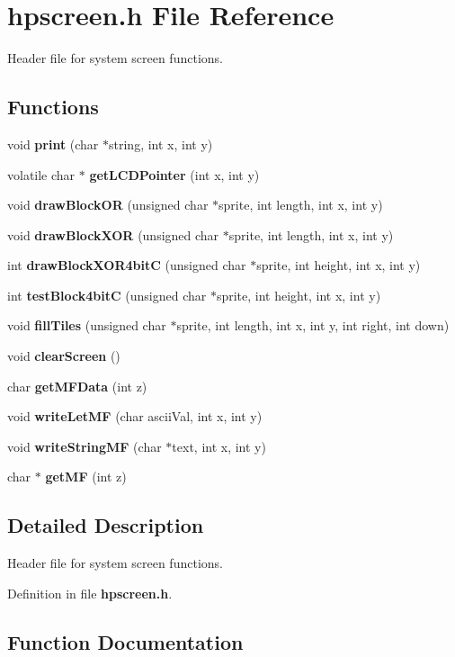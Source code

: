 \section{hpscreen.h File Reference}
\label{hpscreen_8h}
Header file for system screen functions. 


\subsection*{Functions}
\begin{CompactItemize}
\item 
void {\bf print} (char $\ast$string, int x, int y)
\item 
volatile char $\ast$ {\bf get\-LCDPointer} (int x, int y)
\item 
void {\bf draw\-Block\-OR} (unsigned char $\ast$sprite, int length, int x, int y)
\item 
void {\bf draw\-Block\-XOR} (unsigned char $\ast$sprite, int length, int x, int y)
\item 
int {\bf draw\-Block\-XOR4bit\-C} (unsigned char $\ast$sprite, int height, int x, int y)
\item 
int {\bf test\-Block4bit\-C} (unsigned char $\ast$sprite, int height, int x, int y)
\item 
void {\bf fill\-Tiles} (unsigned char $\ast$sprite, int length, int x, int y, int right, int down)
\item 
void {\bf clear\-Screen} ()
\item 
char {\bf get\-MFData} (int z)
\item 
void {\bf write\-Let\-MF} (char ascii\-Val, int x, int y)
\item 
void {\bf write\-String\-MF} (char $\ast$text, int x, int y)
\item 
char $\ast$ {\bf get\-MF} (int z)
\end{CompactItemize}


\subsection{Detailed Description}
Header file for system screen functions.





Definition in file {\bf hpscreen.h}.

\subsection{Function Documentation}
